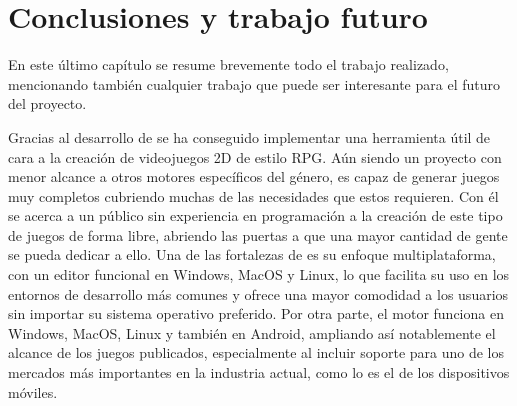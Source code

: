 \chapter{Conclusiones y trabajo futuro}
\label{cap:trabajoFuturo}



\begin{resumen}
En este último capítulo se resume brevemente todo el trabajo realizado, mencionando también cualquier trabajo que puede ser interesante para el futuro del proyecto.
\end{resumen}

Gracias al desarrollo de \baker{} se ha conseguido implementar una herramienta útil de cara a la creación de videojuegos 2D de estilo RPG. Aún siendo un proyecto con menor alcance a otros motores específicos del género, es capaz de generar juegos muy completos cubriendo muchas de las necesidades que estos requieren. Con él se acerca a un público sin experiencia en programación a la creación de este tipo de juegos de forma libre, abriendo las puertas a que una mayor cantidad de gente se pueda dedicar a ello. Una de las fortalezas de \baker{} es su enfoque multiplataforma, con un editor funcional en Windows, MacOS y Linux, lo que facilita su uso en los entornos de desarrollo más comunes y ofrece una mayor comodidad a los usuarios sin importar su sistema operativo preferido. Por otra parte, el motor funciona en Windows, MacOS, Linux y también en Android, ampliando así notablemente el alcance de los juegos publicados, especialmente al incluir soporte para uno de los mercados más importantes en la industria actual, como lo es el de los dispositivos móviles.

\medskip  

